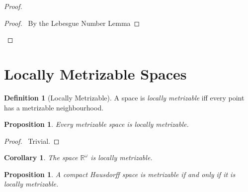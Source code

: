 \documentclass{report}
\let\qed\relax
\newtheorem{prop}[lm]{Proposition}
\newtheorem{cor}{Corollary}[lm]
\theoremstyle{definition}
\newtheorem{df}[lm]{Definition}
\newcommand{\diam}{\ensuremath{\operatorname{diam}}}
\begin{document}
  \begin{proof}
    \pf
    \begin{proof}
      \pf\ By the Lebesgue Number Lemma
    \end{proof}
    \step{<1>6}{$\diam \{ x, y \} < \delta$}
    \qed
  \end{proof}

  \section{Locally Metrizable Spaces}

   \begin{df}[Locally Metrizable]
   A space is \emph{locally metrizable} iff every point has a metrizable
neighbourhood.
 \end{df}

  \begin{prop}
  Every metrizable space is locally metrizable.
 \end{prop}

 \begin{proof}
  \pf\ Trivial. \qed
 \end{proof}

 \begin{cor}
   The space $\mathbb{R}^\omega$ is locally metrizable.
 \end{cor}

   \begin{prop}
  A compact Hausdorff space is metrizable if and only if it is locally
metrizable.
 \end{prop}
\end{document}
